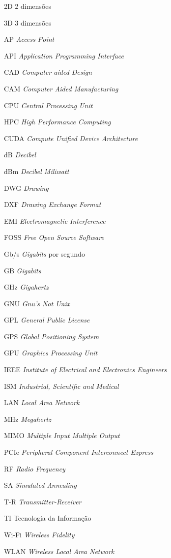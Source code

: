 \documentclass[
	12pt,				%
	twoside,			%
	a4paper,			%
	english,			%
	french,				%
	spanish,			%
	brazil				%
	]{abntex2}
\begin{document}
\begin{siglas}
  \item[2D] 2 dimensões
  \item[3D] 3 dimensões
  \item[AP] \emph{Access Point}
  \item[API] \emph{Application Programming Interface}
  \item[CAD] \emph{Computer-aided Design}
  \item[CAM] \emph{Computer Aided Manufacturing}
  \item[CPU] \emph{Central Processing Unit}
  \item[HPC] \emph{High Performance Computing}
  \item[CUDA] \emph{Compute Unified Device Architecture}
  \item[dB] \emph{Decibel}
  \item[dBm] \emph{Decibel Miliwatt}
  \item[DWG] \emph{Drawing}
  \item[DXF] \emph{Drawing Exchange Format}
  \item[EMI] \emph{Electromagnetic Interference}
  \item[FOSS] \emph{Free Open Source Software}
  \item[Gb/s] \emph{Gigabits} por segundo
  \item[GB] \emph{Gigabits}
  \item[GHz] \emph{Gigahertz}
  \item[GNU] \emph{Gnu's Not Unix}
  \item[GPL] \emph{General Public License}
  \item[GPS] \emph{Global Positioning System}
  \item[GPU] \emph{Graphics Processing Unit}
  \item[IEEE] \emph{Institute of Electrical and Electronics Engineers}
  \item[ISM] \emph{Industrial, Scientific and Medical}
  \item[LAN] \emph{Local Area Network}
  \item[MHz] \emph{Megahertz}
  \item[MIMO] \emph{Multiple Input Multiple Output}
  \item[PCIe] \emph{Peripheral Component Interconnect Express}
  \item[RF] \emph{Radio Frequency}
  \item[SA] \emph{Simulated Annealing}
  \item[T-R] \emph{Transmitter-Receiver}
  \item[TI] Tecnologia da Informação
  \item[Wi-Fi] \emph{Wireless Fidelity}
  \item[WLAN] \emph{Wireless Local Area Network}
\end{siglas}
\end{document}

